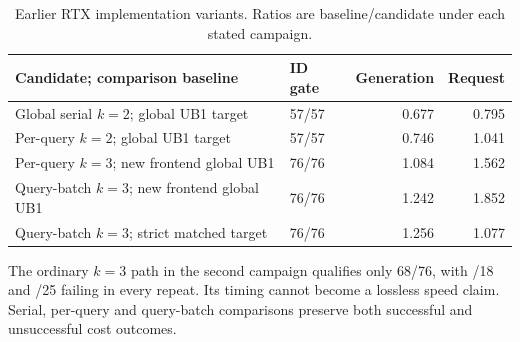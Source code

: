 \begin{table}[t]\centering\small
\caption{Earlier RTX implementation variants. Ratios are baseline/candidate under each stated campaign.}
\label{tab:implementation_history}
\begin{tabularx}{\linewidth}{@{}Xlrr@{}}\toprule
Candidate; comparison baseline & ID gate & Generation & Request\\\midrule
Global serial $k=2$; global UB1 target & 57/57 & 0.677 & 0.795\\
Per-query $k=2$; global UB1 target & 57/57 & 0.746 & 1.041\\
Per-query $k=3$; new frontend global UB1 & 76/76 & 1.084 & 1.562\\
Query-batch $k=3$; new frontend global UB1 & 76/76 & 1.242 & 1.852\\
Query-batch $k=3$; strict matched target & 76/76 & 1.256 & 1.077\\\bottomrule
\end{tabularx}
\end{table}

The ordinary $k=3$ path in the second campaign qualifies only 68/76, with /18 and /25 failing in every repeat. Its timing cannot become a lossless speed claim. Serial, per-query and query-batch comparisons preserve both successful and unsuccessful cost outcomes.

